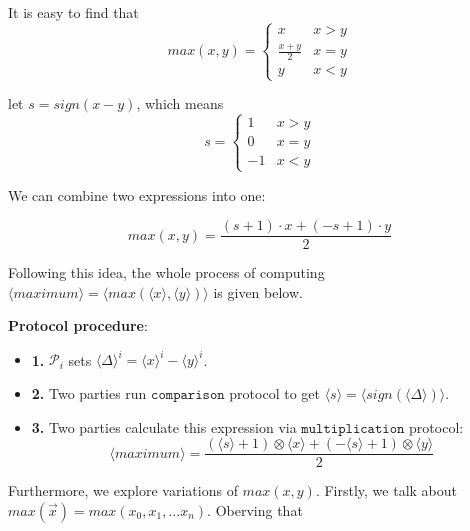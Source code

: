 \documentclass[letterpaper]{article} %
\begin{document}
       It is easy to find that
       $$max(x,y) = \left\{\begin{matrix}
           x & x>y\\ 
           \frac{x+ y}{2} & x=y\\ 
           y & x<y
           \end{matrix}\right.$$
       
       let $s = sign(x-y)$, which means
       $$s = \left\{\begin{matrix}
           1 & x>y\\ 
           0 & x=y\\ 
           -1 & x<y
           \end{matrix}\right.$$
       
       We can combine two expressions into one:
       
       $$max(x,y) = \frac{(s+1)\cdot x+ (-s+1)\cdot y}{2}$$
       
       
       Following this idea, the whole process of computing $\langle maximum\rangle  = \langle max(\langle x\rangle,\langle y\rangle)\rangle$ is given below.
       
       \textbf{Protocol procedure}:
       \begin{itemize}
           \item \textbf{1.} $\mathcal{P}_{i}$ sets $\langle \Delta \rangle^{i}=\langle x\rangle ^{i}-\langle y\rangle ^{i}$.
           \item \textbf{2.} Two parties run $\mathtt{comparison}$ protocol to get $\langle s\rangle =\langle sign(\langle \Delta \rangle)\rangle$.%
           \item \textbf{3.} Two parties calculate this expression via $\mathtt{multiplication}$ protocol:
           $$\langle maximum\rangle=\frac{(\langle s\rangle+1)\otimes \langle x\rangle+ (-\langle s\rangle+1)\otimes \langle y\rangle}{2}$$
       \end{itemize}
       
       Furthermore, we explore variations of $max(x,y)$.
       Firstly, we talk about $max(\overrightarrow{x})=max(x_{0},x_{1},...x_{n})$. Oberving that
       
\end{document}
